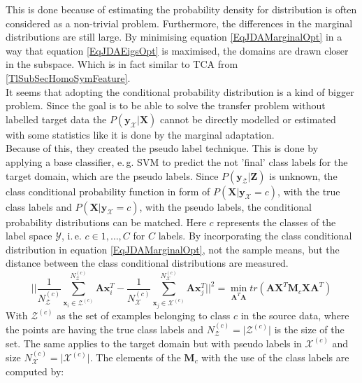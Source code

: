 This is done because of estimating the probability density for distribution is often considered as a non-trivial problem.
Furthermore, the differences in the marginal distributions are still large.
By minimising equation \eqref{EqJDAMarginalOpt} in a way that equation \eqref{EqJDAEigsOpt} is maximised, the domains are drawn closer in the subspace.
Which is in fact similar to \acs{TCA} from \ref{TlSubSecHomoSymFeature}.\cite{Long.}\\
It seems that adopting the conditional probability distribution is a kind of bigger problem.
Since the goal is to be able to solve the transfer problem without labelled target data the $P(\mathbf{y}_\mathcal{X}\vert \mathbf{X})$ cannot be directly modelled or estimated with some statistics like it is done by the marginal adaptation.\cite{Long.}\\
Because of this, they created the pseudo label technique.
This is done by applying a base classifier, e.\,g. \acs{SVM} to predict the not 'final' class labels for the target domain, which are the pseudo labels.
Since $P(\mathbf{y_\mathcal{Z}}\vert \mathbf{Z})$ is unknown, the class conditional probability function in form of $P(\mathbf{X}\vert \mathbf{y}_\mathcal{X}=c)$, with the true class labels and $P(\mathbf{X}\vert \mathbf{y}_\mathcal{X}=c)$, with the pseudo labels, the conditional probability distributions can be matched.
Here $c$ represents the classes of the label space $\mathcal{Y}$, i.\,e. $c\in{1,\dots,C}$ for $C$ labels.
By incorporating the class conditional distribution in equation \eqref{EqJDAMarginalOpt}, not the sample means, but the distance between the class conditional distributions are measured.\cite{Long.}
\begin{equation}\label{EqJDAConditionalOpt}
\bigg|\bigg| \frac{1}{N_\mathcal{Z}^{(c)}} \sum_{\mathbf{x}_i \in \mathcal{Z}^{(c)}}^{N_\mathcal{Z}^{(c)}}\mathbf{A}\mathbf{x}_i^T- \frac{1}{N_\mathcal{X}^{(c)}} \sum_{\mathbf{x}_j \in \mathcal{X}^{(c)}}^{N_\mathcal{X}^{(c)}}\mathbf{A}\mathbf{x}_j^T \bigg|\bigg|^2 = \min_{\mathbf{A}^T\mathbf{A}} tr(\mathbf{A}\mathbf{X}^T\mathbf{M}_c\mathbf{X}\mathbf{A}^T)
\end{equation}
With  $\mathcal{Z}^{(c)}$ as the set of examples belonging to class $c$ in the source data, where the points are having the true class labels and $N_\mathcal{Z}^{(c)} = \vert\mathcal{Z}^{(c)}\vert$ is the size of the set.
The same applies to the target domain but with pseudo labels in $\mathcal{X}^{(c)}$ and size $N_\mathcal{X}^{(c)} = \vert\mathcal{X}^{(c)}\vert$.
The elements of the $\mathbf{M}_c$ with the use of the class labels are computed by: \cite{Long.}
